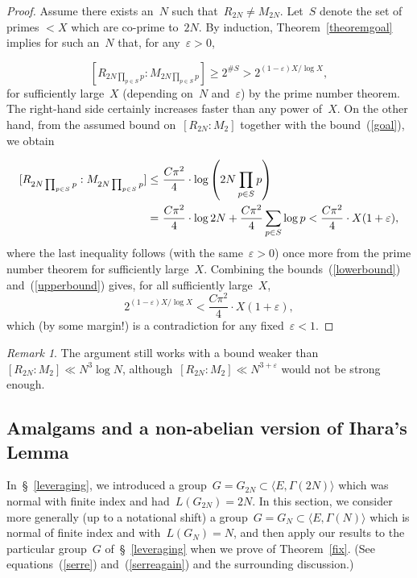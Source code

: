 \documentclass[10pt]{amsart}
\def\SSS{\S}
\theoremstyle{remark}
\newtheorem{remark}[subsubsection]{Remark}
\numberwithin{equation}{subsection}
\def\numequation{\addtocounter{subsubsection}{1}\begin{equation}}
\begin{document}
\begin{proof}
Assume there exists an~$N$ such that~$R_{2N} \ne M_{2N}$.
Let~$S$ denote the set of primes $< X$ which are co-prime to~$2N$.
By induction, Theorem~\ref{theoremgoal}  implies for such an~$N$ that,
for any~$\varepsilon > 0$,
\numequation
\label{lowerbound}
[R_{2N\prod_{p\in S} p}:M_{2N\prod_{p\in S}p}] \ge 2^{\#S}
> 2^{(1 - \varepsilon) X/\log X},
\end{equation}
for sufficiently large~$X$ (depending on~$N$ and~$\varepsilon$) by the prime number theorem.
 The right-hand side
 certainly increases faster than any power of~$X$.
On the other hand, from the assumed bound on~$[R_{2N}:M_2]$
together with the bound~(\ref{goal}), we obtain
\numequation
\label{upperbound}
\begin{aligned}
 \relax [R_{2N\prod_{p\in S}p}:M_{2N\prod_{p\in S}p}]   \le  & \ 
\frac{C \pi^2}{4} \cdot  \log \left(2N\prod_{p\in S}p\right) \\
= & \ \frac{C \pi^2}{4} \cdot  \log 2N + \frac{C \pi^2}{4}  \sum_{p\in S} \log p <  \frac{C \pi^2}{4}   \cdot  X(1 + \varepsilon),
\end{aligned}
\end{equation}
where the last inequality follows  (with the same~$\varepsilon > 0$) once more from the prime number theorem
for sufficiently large~$X$.
Combining the bounds~(\ref{lowerbound})  and~(\ref{upperbound})  gives, for
all sufficiently large~$X$,
$$ 2^{(1 - \varepsilon) X/\log X} < \frac{C \pi^2}{4} \cdot   X(1 + \varepsilon),$$
which (by some margin!)  is a contradiction for any fixed~$\varepsilon < 1$.
\end{proof}

\begin{remark} \label{expansion rate} The argument still works with a bound weaker 
than~$[R_{2N}:M_2] \ll N^3 \log N$, although~$[R_{2N}:M_2] \ll N^{3 + \varepsilon}$ would not be
strong enough.
\end{remark}


\subsection{Amalgams and a non-abelian version of Ihara's Lemma}
\label{amalgams}
In~\SSS~\ref{leveraging}, we introduced a group~$G = G_{2N}  \subset \langle E,\Gamma(2N) \rangle$
which was normal with finite index and had~$L(G_{2N}) = 2N$.
In this section, we consider more generally (up to a notational shift)
a group~$G = G_N  \subset \langle E,\Gamma(N) \rangle$
which is normal of finite index and with~$L(G_{N}) = N$, and then apply our results to the particular
group~$G$ of~\SSS~\ref{leveraging}  when we prove of Theorem~\ref{fix}.
(See equations~(\ref{serre}) and~(\ref{serreagain}) and the surrounding discussion.)
\end{document}

